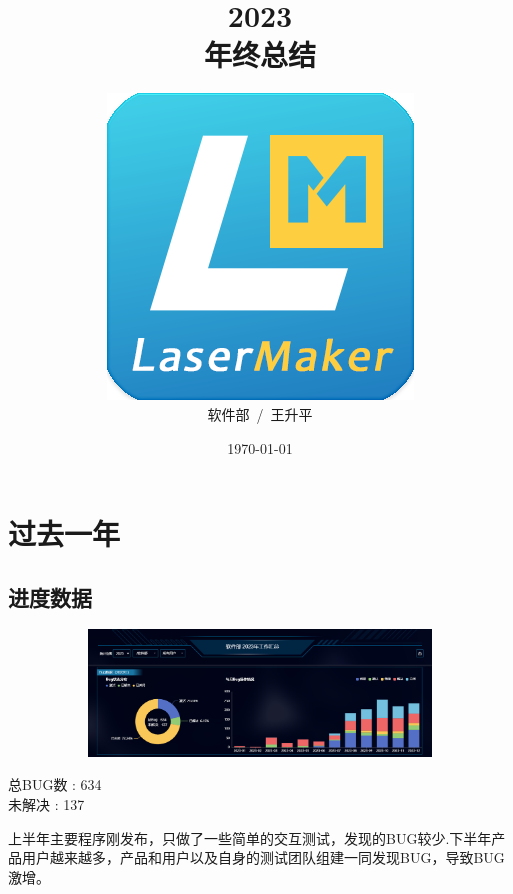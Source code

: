 \documentclass[AutoFakeBold,AutoFakeSlant]{beamer}
\title{\textbf{2023}\\年终总结}
\date{\today}
\author{\includegraphics[width=0.26\linewidth]{LaserMaker}\\软件部~/~王升平}
\begin{document}
	\maketitle
	
	\section{过去一年}
	\subsection{进度数据}
	
	\begin{frame}[fragile]
		\begin{figure}
			\centering %
			\begin{subfigure}{\linewidth}
				\includegraphics[width=\linewidth]{bug}
			\end{subfigure}
		\end{figure} 
		
		\begin{minipage}[l]{0.3\linewidth}
			\large
			总BUG数 : 634 \\
			未解决  : 137
		\end{minipage}\hfill
		\begin{minipage}[l]{0.6\linewidth}
			\footnotesize
			上半年主要程序刚发布，只做了一些简单的交互测试，发现的BUG较少.下半年产品用户越来越多，产品和用户以及自身的测试团队组建一同发现BUG，导致BUG激增。
		\end{minipage}
	\end{frame}
	
\end{document}

